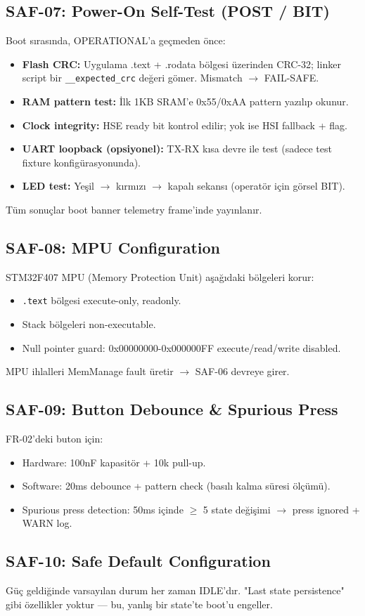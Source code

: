 \subsection{SAF-07: Power-On Self-Test (POST / BIT)}
Boot sırasında, OPERATIONAL'a geçmeden önce:
\begin{itemize}
    \item \textbf{Flash CRC:} Uygulama .text + .rodata bölgesi üzerinden CRC-32; linker script bir \texttt{\_\_expected\_crc} değeri gömer. Mismatch $\rightarrow$ FAIL-SAFE.
    \item \textbf{RAM pattern test:} İlk 1KB SRAM'e 0x55/0xAA pattern yazılıp okunur.
    \item \textbf{Clock integrity:} HSE ready bit kontrol edilir; yok ise HSI fallback + flag.
    \item \textbf{UART loopback (opsiyonel):} TX-RX kısa devre ile test (sadece test fixture konfigürasyonunda).
    \item \textbf{LED test:} Yeşil $\rightarrow$ kırmızı $\rightarrow$ kapalı sekansı (operatör için görsel BIT).
\end{itemize}
Tüm sonuçlar boot banner telemetry frame'inde yayınlanır.

\subsection{SAF-08: MPU Configuration}
STM32F407 MPU (Memory Protection Unit) aşağıdaki bölgeleri korur:
\begin{itemize}
    \item \texttt{.text} bölgesi execute-only, readonly.
    \item Stack bölgeleri non-executable.
    \item Null pointer guard: 0x00000000-0x000000FF execute/read/write disabled.
\end{itemize}
MPU ihlalleri MemManage fault üretir $\rightarrow$ SAF-06 devreye girer.

\subsection{SAF-09: Button Debounce \& Spurious Press}
FR-02'deki buton için:
\begin{itemize}
    \item Hardware: 100nF kapasitör + 10k pull-up.
    \item Software: 20ms debounce + pattern check (basılı kalma süresi ölçümü).
    \item Spurious press detection: 50ms içinde $\geq$ 5 state değişimi $\rightarrow$ press ignored + WARN log.
\end{itemize}

\subsection{SAF-10: Safe Default Configuration}
Güç geldiğinde varsayılan durum her zaman IDLE'dır. "Last state persistence" gibi özellikler yoktur — bu, yanlış bir state'te boot'u engeller.
